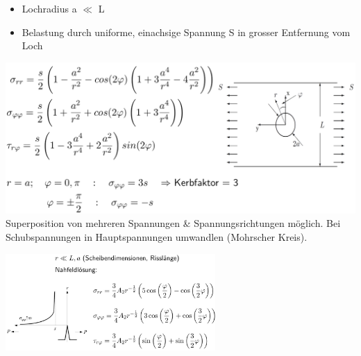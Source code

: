 \documentclass[a4paper,10pt]{article}
\begin{document}
\begin{multicols*}{3}
            \begin{itemize}
                \item Lochradius a $\ll$ L
                \item Belastung durch uniforme, einachsige Spannung S in grosser Entfernung vom Loch
            \end{itemize}
            \includegraphics[width=\linewidth]{Scheibeloch}
            Superposition von mehreren Spannungen \& Spannungsrichtungen möglich. Bei Schubspannungen in Hauptspannungen umwandlen (Mohrscher Kreis).
            
        \includegraphics[width=80mm]{Scheiberiss}
        

\end{multicols*}
\end{document}
